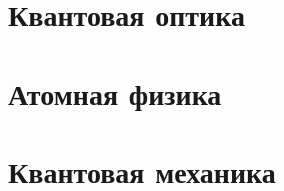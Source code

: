 \documentclass{hedlectures}
\begin{document}
    \section{Квантовая оптика}
    
    
    \section{Атомная физика}
    
    
    \section{Квантовая механика}
    
    
    
    
    \pagebreak
    
\end{document}
